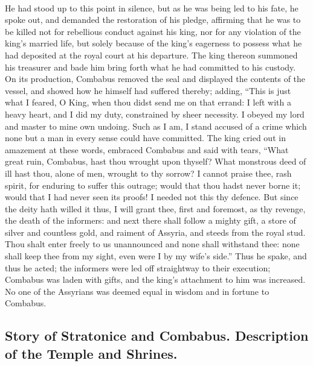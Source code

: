 \documentclass[a4paper, 11pt, oneside, polutonikogreek, english]{article}
\begin{document}
\paragraph{}
He had stood up to this point in silence, but as he was being led to his fate, he spoke out, and demanded the restoration of his pledge, affirming that he was to be killed not for rebellious conduct against his king, nor for any violation of the king's married life, but solely because of the king's eagerness to possess what he had deposited at the royal court at his departure. The king thereon summoned his treasurer and bade him bring forth what he had committed to his custody. On its production, Combabus removed the seal and displayed the contents of the vessel, and showed how he himself had suffered thereby; adding, ``This is just what I feared, O King, when thou didst send me on that errand: I left with a heavy heart, and I did my duty, constrained by sheer necessity. I obeyed my lord and master to mine own undoing. Such as I am, I stand accused of a crime which none but a man in every sense could have committed. The king cried out in amazement at these words, embraced Combabus and said with tears, ``What great ruin, Combabus, hast thou wrought upon thyself? What monstrous deed of ill hast thou, alone of men, wrought to thy sorrow? I cannot praise thee, rash spirit, for enduring to suffer this outrage; would that thou hadst never borne it; would that I had never seen its proofs! I needed not this thy defence. But since the deity hath willed it thus, I will grant thee, first and foremost, as thy revenge, the death of the informers: and next there shall follow a mighty gift, a store of silver and countless gold, and raiment of Assyria, and steeds from the royal stud. Thou shalt enter freely to us unannounced and none shall withstand thee: none shall keep thee from my sight, even were I by my wife's side.'' Thus he spake, and thus he acted; the informers were led off straightway to their execution; Combabus was laden with gifts, and the king's attachment to him was increased. No one of the Assyrians was deemed equal in wisdom and in fortune to Combabus.

\subsection{Story of Stratonice and Combabus. Description of the Temple and Shrines.}
\end{document}
